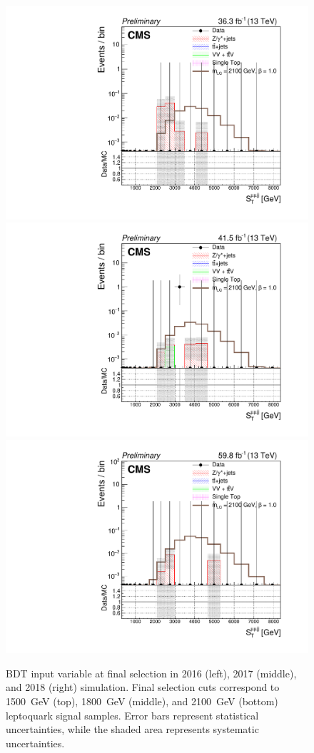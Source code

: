 \begin{figure}[H]
    {\includegraphics[width=.32\textwidth]{Images/Analysis/Results_2016_Unblinded/Plots/Final_selection/BasicLQ_uujj_St_uujj_final2100.pdf}}
    {\includegraphics[width=.32\textwidth]{Images/Analysis/Results_2017_Unblinded/Plots/Final_selection/BasicLQ_uujj_St_uujj_final2100.pdf}}
    {\includegraphics[width=.32\textwidth]{Images/Analysis/Results_2018_Unblinded/Plots/Final_selection/BasicLQ_uujj_St_uujj_final2100.pdf}}
    \caption{BDT input variable \ST at final selection in 2016 (left), 2017 (middle), and 2018 (right) simulation. Final selection cuts correspond to \SI{1500}{GeV} (top), \SI{1800}{GeV} (middle), and \SI{2100}{GeV} (bottom) leptoquark signal samples. Error bars represent statistical uncertainties, while the shaded area represents systematic uncertainties.
    \label{figapp:finalSelST}}
\end{figure}
